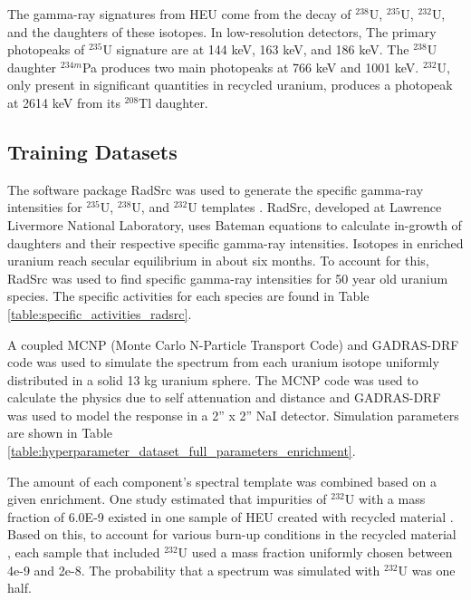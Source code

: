 The gamma-ray signatures from HEU come from the decay of $^{238}$U, $^{235}$U, $^{232}$U, and the daughters of these isotopes. In low-resolution detectors, The primary photopeaks of $^{235}$U signature are at 144 keV, 163 keV, and 186 keV. The $^{238}$U daughter $^{234m}$Pa produces two main photopeaks at 766 keV and 1001 keV. $^{232}$U, only present in significant quantities in recycled uranium, produces a photopeak at 2614 keV from its $^{208}$Tl daughter. 



\subsection{Training Datasets}

The software package RadSrc was used to generate the specific gamma-ray intensities for $^{235}$U, $^{238}$U, and $^{232}$U templates \cite{Hiller2007}. RadSrc, developed at Lawrence Livermore National Laboratory, uses Bateman equations to calculate in-growth of daughters and their respective specific gamma-ray intensities. Isotopes in enriched uranium reach secular equilibrium in about six months. To account for this, RadSrc was used to find specific gamma-ray intensities for 50 year old uranium species. The specific activities for each species are found in Table \ref{table:specific_activities_radsrc}.

A coupled MCNP (Monte Carlo N-Particle Transport Code) and GADRAS-DRF code was used to simulate the spectrum from each uranium isotope uniformly distributed in a solid 13 kg uranium sphere. The MCNP code was used to calculate the physics due to self attenuation and distance and GADRAS-DRF was used to model the response in a 2'' x 2'' NaI detector. Simulation parameters are shown in Table \ref{table:hyperparameter_dataset_full_parameters_enrichment}.

The amount of each component's spectral template was combined based on a given enrichment. One study estimated that impurities of $^{232}$U with a mass fraction of 6.0E-9 existed in one sample of HEU created with recycled material \cite{RawoolSullivan2012}. Based on this, to account for various burn-up conditions in the recycled material \cite{Peurrung2019}, each sample that included $^{232}$U used a mass fraction uniformly chosen between 4e-9 and 2e-8. The probability that a spectrum was simulated with $^{232}$U was one half. 

